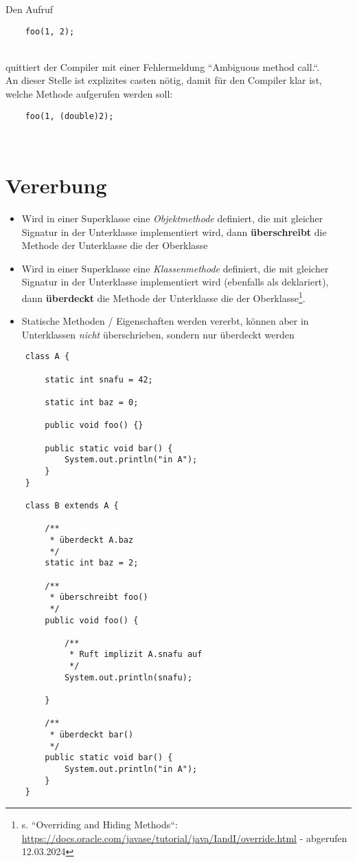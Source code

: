 Den Aufruf

\begin{verbatim}
    foo(1, 2);
\end{verbatim}\\

\noindent
quittiert der Compiler mit einer Fehlermeldung ``Ambiguous method call.``.\\
An dieser Stelle ist explizites casten nötig, damit für den Compiler klar ist, welche Methode aufgerufen werden soll:

\begin{verbatim}
    foo(1, (double)2);
\end{verbatim}\\


\section{Vererbung}

\begin{itemize}
    \item Wird in einer Superklasse eine \textit{Objektmethode} definiert, die mit gleicher Signatur in der Unterklasse implementiert wird, dann \textbf{überschreibt} die Methode der Unterklasse die der Oberklasse
    \item Wird in einer Superklasse eine \textit{Klassenmethode} definiert, die mit gleicher Signatur in der Unterklasse implementiert wird (ebenfalls als  deklariert), dann \textbf{überdeckt} die Methode der Unterklasse die der Oberklasse\footnote{
        s. ``Overriding and Hiding Methods``: \url{https://docs.oracle.com/javase/tutorial/java/IandI/override.html} - abgerufen 12.03.2024
    }.
    \item Statische Methoden / Eigenschaften werden vererbt, können aber in Unterklassen \textit{nicht} überschrieben, sondern nur überdeckt werden
\end{itemize}

\begin{verbatim}
    class A {

        static int snafu = 42;

        static int baz = 0;

        public void foo() {}

        public static void bar() {
            System.out.println("in A");
        }
    }

    class B extends A {

        /**
         * überdeckt A.baz
         */
        static int baz = 2;

        /**
         * überschreibt foo()
         */
        public void foo() {

            /**
             * Ruft implizit A.snafu auf
             */
            System.out.println(snafu);

        }

        /**
         * überdeckt bar()
         */
        public static void bar() {
            System.out.println("in A");
        }
    }
\end{verbatim}
